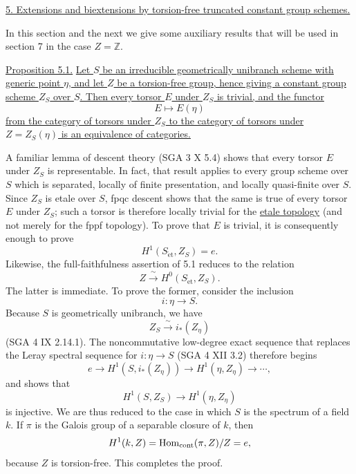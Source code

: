 
\medskip
\noindent\underline{5.  Extensions and biextensions by torsion-free
truncated constant group schemes.}

In this section and the next we give some auxiliary results that will
be used in section 7 in the case $Z=\mathbb Z$.

\medskip
\noindent\underline{Proposition 5.1.}  \underline{Let $S$ be an
irreducible geometrically unibranch scheme with generic point $\eta$,
and let $Z$ be a torsion-free group, hence giving a constant group
scheme $Z_S$ over $S$.  Then every torsor $E$ under $Z_S$ is trivial,
and the functor}
\[
 E\longmapsto E(\eta)
\]
\underline{from the category of torsors under $Z_S$ to the category of
torsors under $Z=Z_S(\eta)$ is an equivalence of categories.}

A familiar lemma of descent theory (SGA 3 X 5.4) shows that every
torsor $E$ under $Z_S$ is representable.  In fact, that result applies
to every group scheme over $S$ which is separated, locally of finite
presentation, and locally quasi-finite over $S$.  Since $Z_S$ is
etale over $S$, fpqc descent shows that the same is true of every
torsor $E$ under $Z_S$; such a torsor is therefore locally trivial for
the \underline{etale topology} (and not merely for the fppf topology).
To prove that $E$ is trivial, it is consequently enough to prove
\[
 H^1(S_{\mathrm{\acute{e}t}},Z_S)=e.
\]
Likewise, the full-faithfulness assertion of 5.1 reduces to the
relation
\[
 Z\xrightarrow{\ \sim\ }H^0(S_{\mathrm{\acute{e}t}},Z_S).
\]
The latter is immediate.  To prove the former, consider the inclusion
\[
 i:\eta\longrightarrow S.
\]
Because $S$ is geometrically unibranch, we have
\[
 Z_S\xrightarrow{\ \sim\ }i_*(Z_\eta)
\]
(SGA 4 IX 2.14.1).  The noncommutative low-degree exact sequence that
replaces the Leray spectral sequence for $i:\eta\to S$ (SGA 4 XII
3.2) therefore begins
\[
 e\longrightarrow H^1(S,i_*(Z_\eta))
   \longrightarrow H^1(\eta,Z_\eta)\longrightarrow\cdots,
\]
and shows that
\[
 H^1(S,Z_S)\longrightarrow H^1(\eta,Z_\eta)
\]
is injective.  We are thus reduced to the case in which $S$ is the
spectrum of a field $k$.  If $\pi$ is the Galois group of a separable
closure of $k$, then
\[
 H^1(k,Z)=\operatorname{Hom}_{\mathrm{cont}}(\pi,Z)/Z=e,
\]
because $Z$ is torsion-free.  This completes the proof.

